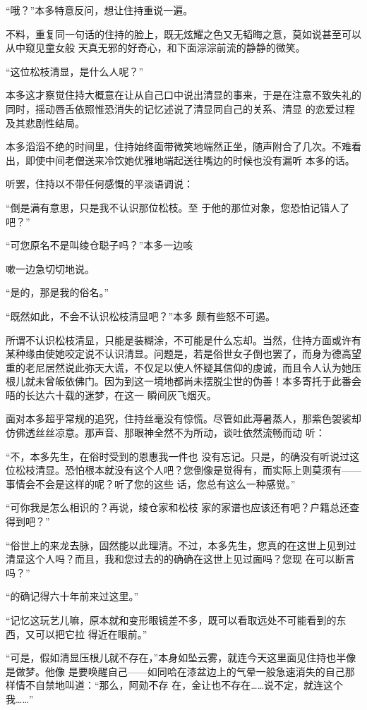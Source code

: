 \documentclass{article}
\begin{document}
“哦？”本多特意反问，想让住持重说一遍。

不料，重复同一句话的住持的脸上，既无炫耀之色又无韬晦之意，莫如说甚至可以从中窥见童女般
\newpage
天真无邪的好奇心，和下面淙淙前流的静静的微笑。


“这位松枝清显，是什么人呢？” 

本多这才察觉住持大概意在让从自己口中说出清显的事来，于是在注意不致失礼的同时，摇动唇舌依照惟恐消失的记忆述说了清显同自己的关系、清显
的恋爱过程及其悲剧性结局。 

本多滔滔不绝的时间里，住持始终面带微笑地端然正坐，随声附合了几次。不难看出，即使中间老僧送来冷饮她优雅地端起送往嘴边的时候也没有漏听
本多的话。 


听罢，住持以不带任何感慨的平淡语调说： 

“倒是满有意思，只是我不认识那位松枝。至
于他的那位对象，您恐怕记错人了吧？” 

“可您原名不是叫绫仓聪子吗？”本多一边咳

\newpage
嗽一边急切切地说。 


“是的，那是我的俗名。” 

“既然如此，不会不认识松枝清显吧？”本多
颇有些怒不可遏。 

所谓不认识松枝清显，只能是装糊涂，不可能是什么忘却。当然，住持方面或许有某种缘由使她咬定说不认识清显。问题是，若是俗世女子倒也罢了，而身为德高望重的老尼居然说此弥天大谎，不仅足以使人怀疑其信仰的虔诚，而且令人认为她压根儿就未曾皈依佛门。因为到这一境地都尚未摆脱尘世的伪善！本多寄托于此番会晤的长达六十载的迷梦，在这一
瞬间灰飞烟灭。 

面对本多超乎常规的追究，住持丝毫没有惊慌。尽管如此溽暑蒸人，那紫色袈裟却仿佛透丝丝凉意。那声音、那眼神全然不为所动，谈吐依然流畅而动
听： 

“不，本多先生，在俗时受到的恩惠我一件也
\newpage
没有忘记。只是，的确没有听说过这位松枝清显。恐怕根本就没有这个人吧？您倒像是觉得有，而实际上则莫须有——事情会不会是这样的呢？听了您的这些
话，您总有这么一种感觉。” 

“可你我是怎么相识的？再说，绫仓家和松枝
家的家谱也应该还有吧？户籍总还查得到吧？” 

“俗世上的来龙去脉，固然能以此理清。不过，本多先生，您真的在这世上见到过清显这个人吗？而且，我和您过去的的确确在这世上见过面吗？您现
在可以断言吗？” 


“的确记得六十年前来过这里。” 

“记忆这玩艺儿嘛，原本就和变形眼镜差不多，既可以看取远处不可能看到的东西，又可以把它拉
得近在眼前。” 

“可是，假如清显压根儿就不存在，”本身如坠云雾，就连今天这里面见住持也半像是做梦。他像
\newpage
是要唤醒自己——如同哈在漆盆边上的气晕一般急速消失的自己那样情不自禁地叫道：“那么，阿勋不存
在，金让也不存在……说不定，就连这个我……” 
\end{document}
